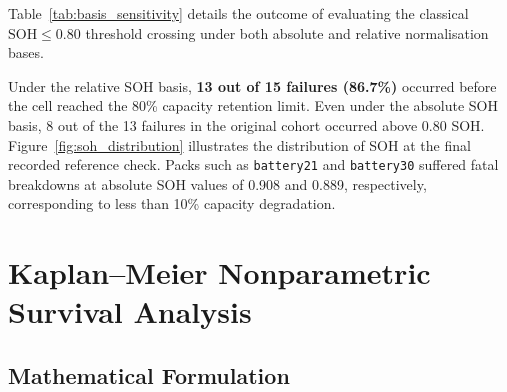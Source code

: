 Table~\ref{tab:basis_sensitivity} details the outcome of evaluating the
classical $\mathrm{SOH} \le 0.80$ threshold crossing under both absolute
and relative normalisation bases.

\begin{table}[htbp]
  \centering
  \caption{Impact of SOH normalisation basis on EOL threshold crossings
  and failure precedence (Script \texttt{24\_pack\_endpoints.py}).}
  \label{tab:basis_sensitivity}
\end{table}

Under the relative SOH basis, \textbf{13 out of 15 failures (86.7\%)}
occurred before the cell reached the 80\% capacity retention limit.
Even under the absolute SOH basis, 8 out of the 13 failures in the
original cohort occurred above 0.80 SOH. Figure~\ref{fig:soh_distribution}
illustrates the distribution of SOH at the final recorded reference check.
Packs such as \texttt{battery21} and \texttt{battery30} suffered fatal
breakdowns at absolute SOH values of 0.908 and 0.889, respectively,
corresponding to less than 10\% capacity degradation.

\section{Kaplan--Meier Nonparametric Survival Analysis}

\subsection{Mathematical Formulation}

